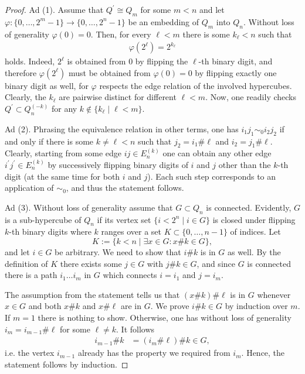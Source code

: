 \documentclass[a4paper]{amsart}
\begin{document}
\begin{proof}
    Ad (1). Assume that $Q^\prime \cong Q_m$ for some $m < n$ and let $\varphi: \{0, \dots, 2^m-1\} \to \{0, \dots, 2^n-1\}$ be an embedding of $Q_m$ into $Q_n$. Without loss of generality $\varphi(0) = 0$. Then, for every $\ell < m$ there is some $k_\ell < n$ such that
    \begin{align*}
        \varphi(2^\ell) = 2^{k_\ell}
    \end{align*}
    holds. Indeed, $2^\ell$ is obtained from $0$ by flipping the $\ell$-th binary digit, and therefore $\varphi(2^\ell)$ must be obtained from $\varphi(0) = 0$ by flipping exactly one binary digit as well, for $\varphi$ respects the edge relation of the involved hypercubes. Clearly, the $k_\ell$ are pairwise distinct for different $\ell < m$. Now, one readily checks $Q^\prime \subset Q_n^{(-k)}$ for any $k \not \in \{k_\ell \mid \ell < m\}$.

    Ad (2). Phrasing the equivalence relation in other terms, one has $i_1 j_1 \sim_0 i_2 j_2$ if and only if there is some $k \neq \ell < n$ such that $j_2 = i_1 \# \ell$ and $i_2 = j_1 \# \ell$.
    Clearly, starting from some edge $i j \in E_n^{(k)}$ one can obtain any other edge $i^\prime j^\prime \in E_n^{(k)}$ by successively flipping binary digits of $i$ and $j$ other than the $k$-th digit (at the same time for both $i$ and $j$). Each such step corresponds to an application of $\sim_0$, and thus the statement follows.

    Ad (3). Without loss of generality assume that $G \subset Q_n$ is connected. Evidently, $G$ is a sub-hypercube of $Q_n$ if its vertex set $\{i < 2^n \mid i \in G\}$ is closed under flipping $k$-th binary digits where $k$ ranges over a set $K \subset \{0, \dots, n-1\}$ of indices. Let 
    $$
    K := \{k < n \mid \exists x \in G: x \# k \in G\},
    $$
    and let $i \in G$ be arbitrary. We need to show that $i \# k$ is in $G$ as well. By the definition of $K$ there exists some $j \in G$ with $j \# k \in G$, and since $G$ is connected there is a path $i_1 \dots i_m$ in $G$ which connects $i = i_1$ and $j = i_m$.
    
    The assumption from the statement tells us that $(x \# k ) \# \ell$ is in $G$ whenever $x \in G$ and both $x \# k$ and $x \# \ell$ are in $G$. We prove $i \# k \in G$ by induction over $m$. If $m = 1$ there is nothing to show. Otherwise, one has without loss of generality $i_m = i_{m-1} \# \ell$ for some $\ell \neq k$. It follows
    \begin{align*}
        i_{m-1} \# k
            &= (i_m \# \ell) \# k \in G,
    \end{align*}
    i.e. the vertex $i_{m-1}$ already has the property we required from $i_m$. Hence, the statement follows by induction.
\end{proof}
\end{document}
